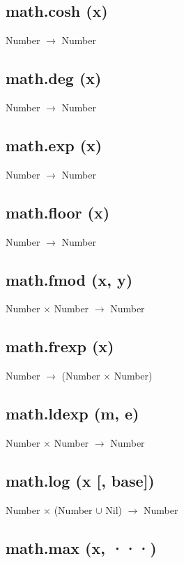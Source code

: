 \documentclass[12pt]{article}
\begin{document}
\subsection{math.cosh (x)}

Number $\rightarrow$ Number

\subsection{math.deg (x)}

Number $\rightarrow$ Number

\subsection{math.exp (x)}

Number $\rightarrow$ Number

\subsection{math.floor (x)}

Number $\rightarrow$ Number

\subsection{math.fmod (x, y)}

Number $\times$ Number $\rightarrow$ Number

\subsection{math.frexp (x)}

Number $\rightarrow$ (Number $\times$ Number)

\subsection{math.ldexp (m, e)}

Number $\times$ Number $\rightarrow$ Number

\subsection{math.log (x [, base])}

Number $\times$
(Number $\cup$ Nil) $\rightarrow$
Number

\subsection{math.max (x, ···)}
\end{document}
